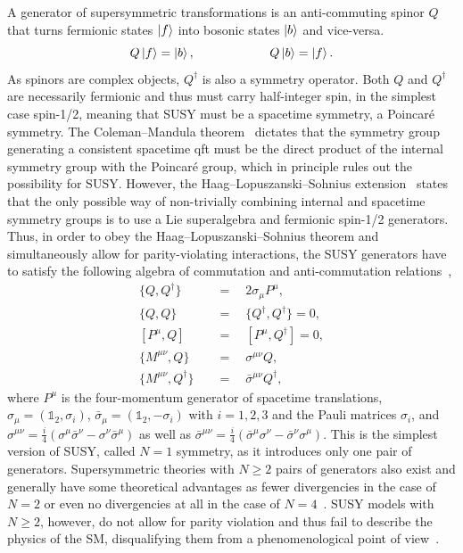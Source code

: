 A generator of supersymmetric transformations is an anti-commuting spinor $Q$ that turns fermionic states $\ket{f}$ into bosonic states $\ket{b}$ and vice-versa.
\begin{equation}
	Q\ket{f} = \ket{b}, \qquad \qquad \qquad Q\ket{b}=\ket{f}.
\end{equation}
As spinors are complex objects, $Q^\dagger$ is also a symmetry operator. Both $Q$ and $Q^\dagger$ are necessarily fermionic and thus must carry half-integer spin, in the simplest case spin-1/2, meaning that SUSY must be a spacetime symmetry, \ie a Poincaré symmetry. The Coleman--Mandula theorem~\cite{PhysRev.159.1251} dictates that the symmetry group generating a consistent spacetime \gls{qft} must be the direct product of the internal symmetry group with the Poincaré group, which in principle rules out the possibility for SUSY. However, the Haag--Lopuszanski--Sohnius extension~\cite{Haag:1974qh} states that the only possible way of non-trivially combining internal and spacetime symmetry groups is to use a Lie superalgebra and fermionic spin-1/2 generators. Thus, in order to obey the Haag--Lopuszanski--Sohnius theorem and simultaneously allow for parity-violating interactions, the SUSY generators have to satisfy the following algebra of commutation and anti-commutation relations~\cite{Bustamante:2009us},
\begin{equation}
\begin{split}
	\{ Q,Q^\dagger \} & \quad = \quad  2\sigma_\mu P^\mu,\\
	\{ Q,Q \} &  \quad = \quad \{ Q^\dagger,Q^\dagger \} = 0, \\
	\left[P^\mu,Q \right] &  \quad = \quad \left[ P^\mu,Q^\dagger \right] = 0, \\
	\{ M^{\mu\nu}, Q \} & \quad = \quad \sigma^{\mu\nu} Q,\\
	\{ M^{\mu\nu},Q^\dagger \} & \quad = \quad \bar{\sigma}^{\mu\nu} Q^\dagger,
  \label{eq:commute}
\end{split}
\end{equation}
where $P^\mu$ is the four-momentum generator of spacetime translations, $\sigma_\mu = (\mathbb{1}_2,\sigma_i)$, $\bar{\sigma}_\mu = (\mathbb{1}_2,-\sigma_i)$ with $i=1,2,3$ and the Pauli matrices $\sigma_i$, and $\sigma^{\mu\nu} = \frac{i}{4}(\sigma^\mu\bar{\sigma}^\nu - \sigma^\nu\bar{\sigma}^\mu)$ as well as $\bar{\sigma}^{\mu\nu} = \frac{i}{4}(\bar{\sigma}^\mu\sigma^\nu - \bar{\sigma}^\nu\sigma^\mu)$. This is the simplest version of SUSY, called $N=1$ symmetry, as it introduces only one pair of generators. Supersymmetric theories with $N\geq 2$ pairs of generators also exist and generally have some theoretical advantages as \eg fewer divergencies in the case of $N=2$ or even no divergencies at all in the case of $N=4$~\cite{Bustamante:2009us}. SUSY models with $N\geq 2$, however, do not allow for parity violation and thus fail to describe the physics of the SM, disqualifying them from a phenomenological point of view~\cite{Bustamante:2009us}.

